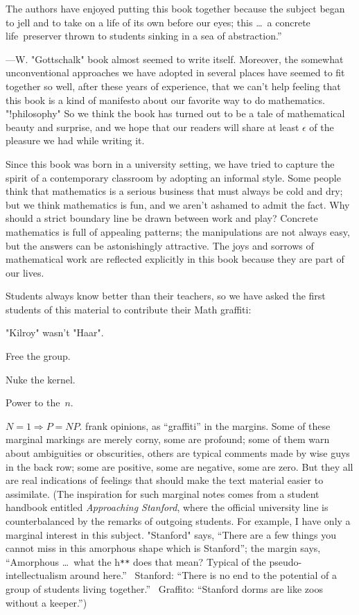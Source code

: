 The authors have enjoyed putting this book together because the subject
began to jell and to take on a life of its own before our eyes; this
\g\noindent{}\dots\ a concrete life~preserver thrown to students
sinking in a sea of abstraction.''\par\hfill\dash---W. "Gottschalk"\g
book almost seemed to write itself. Moreover, the somewhat unconventional
approaches we have adopted in several places have seemed to fit together
so well, after these years of experience,
that we can't help feeling that this book is a kind of manifesto
about our favorite way to do mathematics. "!philosophy"
So we think the book has turned
out to be a tale of mathematical beauty and surprise, and we hope that
our readers will share at least $\epsilon$ of the pleasure we had
while writing it.

Since this book was born in a university setting, we have tried to
capture the spirit of a contemporary classroom by
adopting an informal style. Some people think that mathematics
is a serious business that must always be cold and dry; but we think
mathematics is fun, and we aren't ashamed to admit the fact.
Why should a strict boundary line be drawn between work and play?
Concrete mathematics is full of appealing patterns; the manipulations
are not always easy, but the answers can be astonishingly
attractive. The joys and sorrows of mathematical work are reflected
explicitly in this book because they are part of our lives.

Students always know better than their teachers, so we have asked
the first students of this material to contribute their
\g Math graffiti:\par\smallskip
"Kilroy" wasn't "Haar".\par
Free the group.\par
Nuke the kernel.\par
Power to the~$n$.\par
$N{=}1\Rightarrow P{=}NP$.\g
frank opinions, as ``graffiti'' in the margins. Some of these marginal
markings are merely corny, some are profound; some of them warn
about ambiguities or obscurities, others are typical comments made
by wise guys in the back row; some are positive, some are negative,
some are zero. But they all are real indications of feelings that
should make the text material easier to assimilate. (The inspiration
for such marginal notes comes from a student handbook entitled
{\sl Approaching Stanford}, where the official university line is
counterbalanced by the remarks of outgoing students. For example,
\g I have only a marginal interest in this subject.\g
"Stanford" says, ``There are a few things you cannot miss in this amorphous
shape which is Stanford''; the margin says, ``Amorphous \dots\ what
the h{\tt***} does that mean? Typical of the pseudo-intellectualism
around here.'' \ Stanford: ``There is no end to the potential
of a group of students living together.'' \ Graffito: ``Stanford dorms
are like zoos without a keeper.'')

